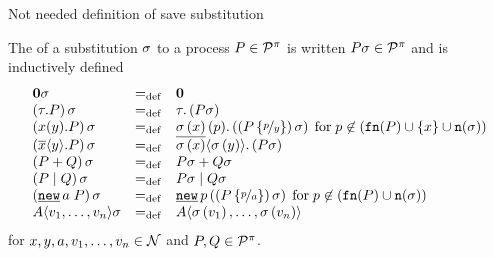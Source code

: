 \begin{old}{Not needed definition of save substitution}
\begin{definition}
The  of a substitution $\sigma$ to a process $P\in\mathcal P^{\pi}$ is written $P\sigma\in\mathcal P^{\pi}$ and is inductively defined
	\begin{equation*}	
		\begin{aligned}			
			\begin{array}{lcl}
				\proczero\substF & \define & \proczero \\
				\subst{\tau.P} & \define & \tau.\left(P\substF\right) \\
				\subst{\inp{x}{y}.P} & \define & \inp{\substF\left(x\right)}{p}.\left(\subst{P\subs{p}{y}}\right) \;\text{for}\;p\nin\left(\fn{P}\cup\set{x}\cup\n{\substF}\right) \\
				\subst{\out{x}{y}.P} & \define & \out{\substF\left(x\right)}{\substF\left(y\right)}.\left(P\substF\right) \\
				\subst{\procchoice{P}{Q}} & \define & \procchoice{P\substF}{Q\substF} \\
				\subst{\procpar{P}{Q}} & \define & \procpar{P\substF}{Q\substF} \\
				\subst{\procres{a}{P}} & \define & \procres[a]{p}{\subst{P\subs{p}{a}}} \;\text{for}\;p\nin\left(\fn{P}\cup\n{\substF}\right)\\
				\proccall{A}{v_1,\ldots,v_n}\substF & \define & \proccall{A}{\substF\left(v_1\right),\ldots,\substF\left(v_n\right)} \\
			\end{array}
		\end{aligned}
	\end{equation*}
for $x,y,a,v_1,\ldots,v_n\in\mathcal N$ and $P,Q\in\mathcal P^{\pi}$.
\end{definition}
\end{old}
